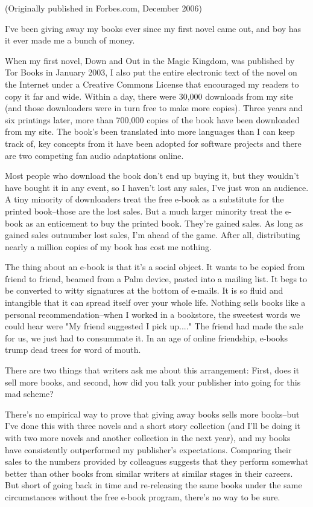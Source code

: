 (Originally published in Forbes.com, December 2006)

I've been giving away my books ever since my first novel came out,
and boy has it ever made me a bunch of money.

When my first novel, Down and Out in the Magic Kingdom, was
published by Tor Books in January 2003, I also put the entire
electronic text of the novel on the Internet under a Creative
Commons License that encouraged my readers to copy it far and wide.
Within a day, there were 30,000 downloads from my site (and those
downloaders were in turn free to make more copies). Three years and
six printings later, more than 700,000 copies of the book have been
downloaded from my site. The book's been translated into more
languages than I can keep track of, key concepts from it have been
adopted for software projects and there are two competing fan audio
adaptations online.

Most people who download the book don't end up buying it, but they
wouldn't have bought it in any event, so I haven't lost any sales,
I've just won an audience. A tiny minority of downloaders treat the
free e-book as a substitute for the printed book--those are the
lost sales. But a much larger minority treat the e-book as an
enticement to buy the printed book. They're gained sales. As long
as gained sales outnumber lost sales, I'm ahead of the game. After
all, distributing nearly a million copies of my book has cost me
nothing.

The thing about an e-book is that it's a social object. It wants to
be copied from friend to friend, beamed from a Palm device, pasted
into a mailing list. It begs to be converted to witty signatures at
the bottom of e-mails. It is so fluid and intangible that it can
spread itself over your whole life. Nothing sells books like a
personal recommendation--when I worked in a bookstore, the sweetest
words we could hear were "My friend suggested I pick up...." The
friend had made the sale for us, we just had to consummate it. In
an age of online friendship, e-books trump dead trees for word of
mouth.

There are two things that writers ask me about this arrangement:
First, does it sell more books, and second, how did you talk your
publisher into going for this mad scheme?

There's no empirical way to prove that giving away books sells more
books--but I've done this with three novels and a short story
collection (and I'll be doing it with two more novels and another
collection in the next year), and my books have consistently
outperformed my publisher's expectations. Comparing their sales to
the numbers provided by colleagues suggests that they perform
somewhat better than other books from similar writers at similar
stages in their careers. But short of going back in time and
re-releasing the same books under the same circumstances without
the free e-book program, there's no way to be sure.

